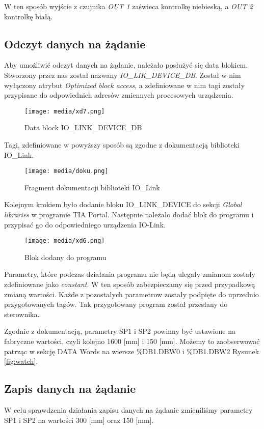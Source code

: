 \documentclass{article}
\begin{document}
W ten sposób wyjście z czujnika \textit{OUT 1} zaświeca kontrolkę niebieską, a \textit{OUT 2} kontrolkę białą.

\subsection{Odczyt danych na żądanie}

Aby umożliwić odczyt danych na żądanie, należało posłużyć się data blokiem. Stworzony przez nas został nazwany \textit{IO\_LIK\_DEVICE\_DB}. Został w nim wyłączony atrybut \textit{Optimized block access}, a zdefiniowane w nim tagi zostały przypisane do odpowiednich adresów zmiennych procesowych urządzenia.

\begin{figure}[H]
    \centering
    \texttt{[image: media/xd7.png]}
    \caption{Data block IO\_LINK\_DEVICE\_DB}
    \label{fig:db}
\end{figure}

Tagi, zdefiniowane w powyższy sposób są zgodne z dokumentacją biblioteki IO\_Link.
\begin{figure}[H]
    \centering
    \texttt{[image: media/doku.png]}
    \caption{Fragment dokumentacji biblioteki IO\_Link}
    \label{fig:tagi}
\end{figure}

Kolejnym krokiem było dodanie bloku IO\_LINK\_DEVICE do sekcji \textit{Global libraries} w programie TIA Portal. Następnie należało dodać blok do programu i przypisać go do odpowiedniego urządzenia IO-Link. 

\begin{figure}[H]
    \centering
    \texttt{[image: media/xd6.png]}
    \caption{Blok dodany do programu}
    \label{fig:blok}
\end{figure}

Parametry, które podczas działania programu nie będą ulegały zmianom zostały zdefiniowane jako \textit{constant}. W ten sposób zabezpieczamy się przed przypadkową zmianą wartości. Każde z pozostałych parametrow zostały podpięte do uprzednio przygotowanych tagów. Tak przygotowany program został przesłany do sterownika.

Zgodnie z dokumentacją, parametry SP1 i SP2 powinny być ustawione na fabryczne wartości, czyli kolejno 1600 [mm] i 150 [mm]. Możemy to zaobserwować patrząc w sekcję DATA Words na wiersze \%DB1.DBW0 i \%DB1.DBW2 Rysunek \ref{fig:watch}.

\subsection{Zapis danych na żądanie}
W celu sprawdzenia działania zapisu danych na żądanie zmieniliśmy parametry SP1 i SP2 na wartości 300 [mm] oraz 150 [mm].
\end{document}
